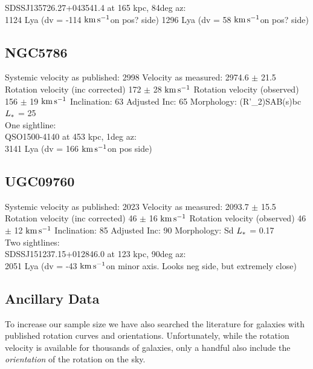 \documentclass[iop]{emulateapj-rtx4}
\newcommand{\kms}{$\rm km\, s^{-1}$}
\begin{document}
SDSSJ135726.27+043541.4 at 165 kpc, 84deg az: \\
1124 Lya (dv = -114 \kms on pos? side)
1296 Lya (dv = 58 \kms on pos? side)



\subsection{NGC5786}
Systemic velocity as published: 2998
Velocity as measured: 2974.6 $\pm$ 21.5
Rotation velocity (inc corrected) 172 $\pm$ 28 \kms
Rotation velocity (observed) 156 $\pm$ 19 \kms
Inclination: 63
Adjusted Inc: 65
Morphology: (R'\_2)SAB(s)bc
$L_{\**}$ = 25 \\

One sightline: \\
QSO1500-4140 at 453 kpc, 1deg az: \\
3141 Lya (dv = 166 \kms on pos side)


\subsection{UGC09760}
Systemic velocity as published: 2023
Velocity as measured: 2093.7 $\pm$ 15.5
Rotation velocity (inc corrected) 46 $\pm$ 16 \kms
Rotation velocity (observed) 46 $\pm$ 12 \kms
Inclination: 85
Adjusted Inc: 90
Morphology: Sd
$L_{\**}$ = 0.17 \\

Two sightlines: \\
SDSSJ151237.15+012846.0 at 123 kpc, 90deg az: \\
2051 Lya (dv = -43 \kms on minor axis. Looks neg side, but extremely close)



\subsection{Ancillary Data}
To increase our sample size we have also searched the literature for galaxies with published rotation curves and orientations. Unfortunately, while the rotation velocity is available for thousands of galaxies, only a handful also include the \emph{orientation} of the rotation on the sky. 
\end{document}
